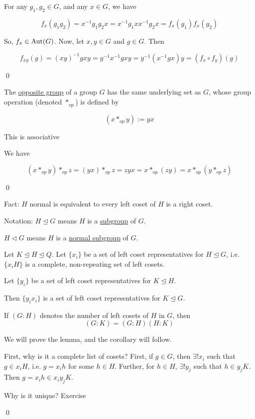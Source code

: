 \documentclass[x11names,reqno,14pt]{extarticle}
\begin{document}
\proof

For any $g_1, g_2 \in G$, and any $x \in G$, we have

\[
f_x(g_1g_2) = x^{-1}g_1g_2x = x^{-1}g_1xx^{-1}g_2x =f_x(g_1)f_x(g_2)
\]

So, $f_x \in {\mathrm{Aut}}(G)$. Now, let $x, y \in G$ and $g \in G$. Then

\[
f_{xy}(g) = (xy)^{-1}gxy = y^{-1}x^{-1}gxy = y^{-1}(x^{-1}gx)y = (f_x \circ f_y) (g)
\]

\qed


The \underline{opposite group} of a group $G$ has the same underlying set as $G$, whose group operation (denoted $*_{op}$) is defined by

\[
(x*_{op}y) := yx
\]

\claim This is associative

\proof

We have 

\[
(x*_{op}y)*_{op}z = (yx)*_{op}z = zyx = x*_{op}(zy) = x*_{op}(y*_{op}z)
\]

\qed

Fact: $H$ normal is equivalent to every left coset of $H$ is a right coset.

Notation: $H\unlhd G$ means $H$ is a \underline{subgroup} of $G$. 

$H\lhd G$ means $H$ is a \underline{normal subgroup} of $G$. 

\lem Let $K\unlhd H \unlhd Q$. Let $\{x_i\}$ be a set of left coset representatives for $H\unlhd G$, i.e. $\{x_iH\}$ is a complete, non-repeating set of left cosets. 

Let $\{y_i\}$ be a set of left coset representatives for $K\unlhd H$. 

Then $\{y_ix_i\}$ is a set of left coset representatives for $K \unlhd G$. 

\cor

If $(G:H)$ denotes the number of left cosets of $H$ in $G$, then 
\[
(G:K) = (G:H)(H:K)
\]

\proof

We will prove the lemma, and the corollary will follow. 

First, why is it a complete list of cosets? First, if $g \in G$, then $\exists ! x_i$ such that $g \in x_iH$, i.e. $g = x_ih$ for some $h \in H$. Further, for $h \in H$, $\exists!y_j$ such that $h \in y_jK$. Then $g = x_ih \in x_iy_jK$.

Why is it unique? Exercise 

\qed
\end{document}
